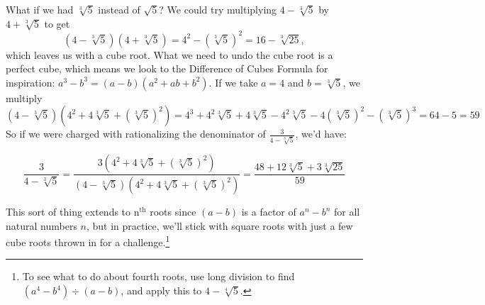 \documentclass{ximera}
\begin{document}
What if we had $\sqrt[3]{5}$ instead of $\sqrt{5}$?  We could try multiplying $4 - \sqrt[3]{5}$ by $4 + \sqrt[3]{5}$ to get  \[(4 - \sqrt[3]{5})(4 + \sqrt[3]{5}) = 4^2 - (\sqrt[3]{5})^2 = 16 - \sqrt[3]{25},\] which leaves us with a cube root.  What we need to undo the cube root is a perfect cube, which means we look to the Difference of Cubes Formula for inspiration:  $a^3 - b^3 = (a-b)(a^2+ab+b^2)$.  If we take $a = 4$ and $b = \sqrt[3]{5}$, we multiply \[ (4 - \sqrt[3]{5})(4^2 + 4\sqrt[3]{5} + (\sqrt[3]{5})^2) = 4^3 + 4^2\sqrt[3]{5} + 4 \sqrt[3]{5} - 4^2\sqrt[3]{5}-4(\sqrt[3]{5})^2 - (\sqrt[3]{5})^3 = 64 - 5 = 59\] So if we were charged with rationalizing the denominator of $\frac{3}{4 - \sqrt[3]{5}}$, we'd have:

\[ \dfrac{3}{4 - \sqrt[3]{5}} = \dfrac{3(4^2 + 4\sqrt[3]{5} + (\sqrt[3]{5})^2)}{(4 - \sqrt[3]{5})(4^2 + 4\sqrt[3]{5} + (\sqrt[3]{5})^2)} = \dfrac{48 + 12\sqrt[3]{5}+ 3\sqrt[3]{25}}{59}\]

This sort of thing extends to $\text{n}^{\text{th}}$ roots since $(a-b)$ is a factor of $a^n - b^n$ for all natural numbers $n$, but in practice, we'll stick with square roots with just a few cube roots thrown in for a challenge.\footnote{To see what to do about fourth roots, use long division to find $(a^4 - b^4) \div (a-b)$, and apply this to $4 - \sqrt[4]{5}$.}
\end{document}
